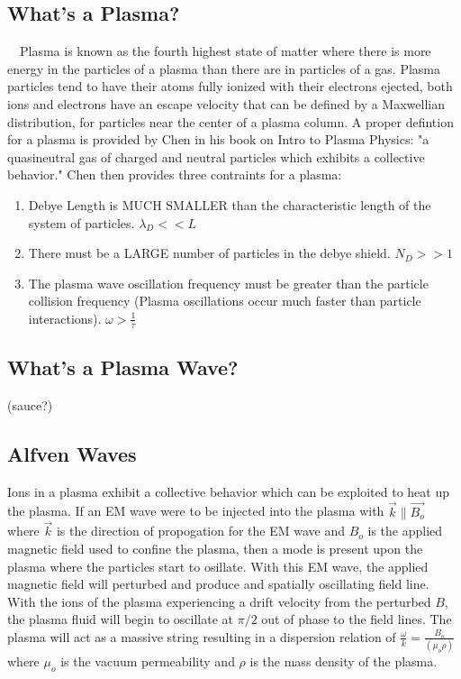 \documentclass[11pt]{article}
\theoremstyle{quest}
\begin{document}
\subsection{What's a Plasma?}
~~Plasma is known as the fourth highest state of matter where there is more energy in the particles of a plasma than there are in particles of a gas. Plasma particles tend to have their atoms fully ionized with their electrons ejected, both ions and electrons have an escape velocity that can be defined by a Maxwellian distribution, for particles near the center of a plasma column. A proper defintion for a plasma is provided by Chen in his book on Intro to Plasma Physics: "a quasineutral gas of charged and neutral particles which exhibits a collective behavior." Chen then provides three contraints for a plasma:
\begin{enumerate}
	\item Debye Length is MUCH SMALLER than the characteristic length of the system of particles. $\lambda_D << L$
	\item There must be a LARGE number of particles in the debye shield. $N_D>>1$
	\item The plasma wave oscillation frequency must be greater than the particle collision frequency (Plasma oscillations occur much faster than particle interactions). $\omega > \frac{1}{\tau}$
\end{enumerate}
\subsection{What's a Plasma Wave?}
(sauce?)
\subsection{Alfven Waves}
Ions in a plasma exhibit a collective behavior which can be exploited to heat up the plasma. If an EM wave were to be injected into the plasma with $\vec{k} \parallel \vec{B_o}$ where $\vec{k}$ is the direction of propogation for the EM wave and $B_o$ is the applied magnetic field used to confine the plasma, then a mode is present upon the plasma where the particles start to osillate. With this EM wave, the applied magnetic field will perturbed and produce and spatially oscillating field line. With the ions of the plasma experiencing a drift velocity from the perturbed $B$, the plasma fluid will begin to oscillate at $\pi/2$ out of phase to the field lines. The plasma will act as a massive string resulting in a dispersion relation of $\frac{\omega}{k} = \frac{B_o}{\left( \mu_o \rho\right)}$ where $\mu_o$ is the vacuum permeability and $\rho$ is the mass density of the plasma.
\end{document}
